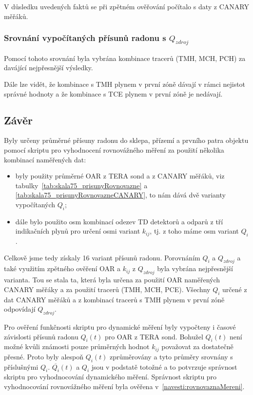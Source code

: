 V důsledku uvedených faktů se při zpětném ověřování počítalo s daty z CANARY měřáků.

\subsubsection{Srovnání vypočítaných přísunů radonu s $Q_{zdroj}$}
Pomocí tohoto srovnání byla vybrána kombinace tracerů (TMH, MCH, PCH) za davájící nejpřesnější výsledky. 

Dále lze vidět, že kombinace s TMH plynem v první zóně dávají v rámci nejistot správné hodnoty a že kombinace s TCE plynem v první zóně je nedávají.

\subsection{Závěr}
Byly určeny průměrné přísuny radonu do sklepa, přízemí a prvního patra objektu pomocí skriptu pro vyhodnocení rovnovážného měření za použití několika kombinací naměřených dat:
\begin{itemize}
    \item byly použity průměrné OAR z TERA sond a z CANARY měřáků, viz tabulky~\ref{tab:skala75_prisunyRovnovazne} a \ref{tab:skala75_prisunyRovnovazneCANARY}, to nám dává dvě varianty vypočítaných $Q_i$;
    \item dále bylo použito osm kombinací odezev TD detektorů a odparů z tří indikačních plynů pro určení osmi variant $k_{ij}$, tj. z toho máme osm variant $Q_i$.
\end{itemize}
Celkově jsme tedy získaly 16 variant přísunů radonu. Porovnáním $Q_i$ a $Q_{zdroj}$ a také využitím zpětného ověření OAR a $k_{ij}$ z $Q_{zdroj}$ byla vybrána nejpřesnější varianta. Tou se stala ta, která byla určena za použití OAR naměřených CANARY měřáky a za použití tracerů (TMH, MCH, PCE). Všechny $Q_i$ určené z dat CANARY měřáků a z kombinací tracerů s TMH plynem v první zóně odpovídají $Q_{zdroj}$.

Pro ověření funkčnosti skriptu pro dynamické měření byly vypočteny i časové závislosti přísunů radonu $Q_i(t)$ pro OAR z TERA sond. Bohužel $Q_i(t)$ není možné kvůli známosti pouze průměrných hodnot $k_{ij}$ považovat za dostatečně přesné. Proto byly alespoň $Q_i(t)$ zprůměrovány a tyto průměry srovnány s příslušnými $Q_i$. $\overline{Q_i}(t)$ a $Q_i$ jsou v podstatě totožné a to potvrzuje správnost skriptu pro vyhodnocování dynamického měření. Správnost skriptu pro vyhodnocování rovnovážného měření byla ověřena v~\ref{navesti:rovnovaznaMereni}.

